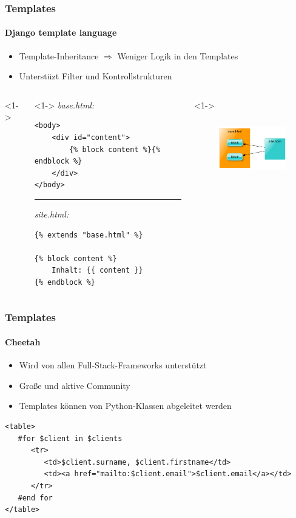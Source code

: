 \documentclass[
    t,
    smaller,
    compress,
    xcolor=svgnames,            %
    table,
]{beamer}
\begin{document}
\begin{frame}[fragile]
    \frametitle{Templates}
    \framesubtitle{Django template language}
     \begin{itemize}[<1->]
        \item Template-Inheritance $\Rightarrow$ Weniger Logik in den Templates
        \item Unterstüzt Filter und Kontrollstrukturen
     \end{itemize}
\vspace{12pt}
\begin{columns}<1->
    \begin{column}{.65\textwidth}<1->
	\textit{base.html:}
\begin{lstlisting}
<body>
    <div id="content">
        {% block content %}{% endblock %}
    </div>
</body>
\end{lstlisting}
\hrule
\vspace{12pt}
\textit{site.html:}
\begin{lstlisting}
{% extends "base.html" %}

{% block content %}
    Inhalt: {{ content }}
{% endblock %}
\end{lstlisting}
    \end{column}

    \begin{column}{.35\textwidth}<1->
    \vspace{12pt}
     \begin{figure}
        \includegraphics[height=25mm] {template.png}
      \end{figure}
    \end{column}
\end{columns}
\end{frame}


\begin{frame}[fragile]
    \frametitle{Templates}
    \framesubtitle{Cheetah}
     \begin{itemize}[<1->]
        \item Wird von allen Full-Stack-Frameworks unterstützt
        \item Große und aktive Community
        \item Templates können von Python-Klassen abgeleitet werden
     \end{itemize}
\begin{lstlisting}
<table>
   #for $client in $clients
      <tr>
         <td>$client.surname, $client.firstname</td>
         <td><a href="mailto:$client.email">$client.email</a></td>
      </tr>
   #end for
</table>
\end{lstlisting}
\end{frame}
\end{document}
